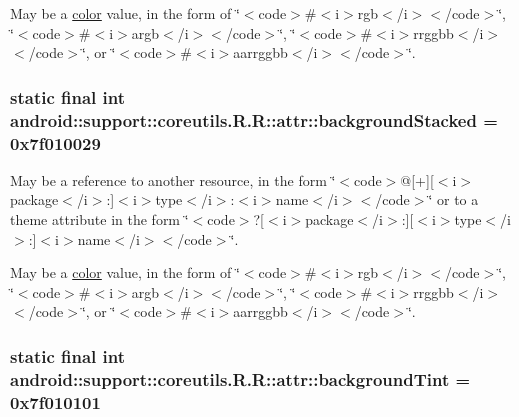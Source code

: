 May be a \hyperlink{classandroid_1_1support_1_1coreutils_1_1_r_1_1color}{color} value, in the form of \char`\"{}$<$code$>$\#$<$i$>$rgb$<$/i$>$$<$/code$>$\char`\"{}, \char`\"{}$<$code$>$\#$<$i$>$argb$<$/i$>$$<$/code$>$\char`\"{}, \char`\"{}$<$code$>$\#$<$i$>$rrggbb$<$/i$>$$<$/code$>$\char`\"{}, or \char`\"{}$<$code$>$\#$<$i$>$aarrggbb$<$/i$>$$<$/code$>$\char`\"{}. \hypertarget{classandroid_1_1support_1_1coreutils_1_1_r_1_1attr_e9e84abbf14f33931b1a8615db14a4fa}{
\subsubsection[{backgroundStacked}]{\setlength{\rightskip}{0pt plus 5cm}static final int android::support::coreutils.R.R::attr::backgroundStacked = 0x7f010029}}
\label{classandroid_1_1support_1_1coreutils_1_1_r_1_1attr_e9e84abbf14f33931b1a8615db14a4fa}


May be a reference to another resource, in the form \char`\"{}$<$code$>$@\mbox{[}+\mbox{]}\mbox{[}$<$i$>$package$<$/i$>$:\mbox{]}$<$i$>$type$<$/i$>$:$<$i$>$name$<$/i$>$$<$/code$>$\char`\"{} or to a theme attribute in the form \char`\"{}$<$code$>$?\mbox{[}$<$i$>$package$<$/i$>$:\mbox{]}\mbox{[}$<$i$>$type$<$/i$>$:\mbox{]}$<$i$>$name$<$/i$>$$<$/code$>$\char`\"{}. 

May be a \hyperlink{classandroid_1_1support_1_1coreutils_1_1_r_1_1color}{color} value, in the form of \char`\"{}$<$code$>$\#$<$i$>$rgb$<$/i$>$$<$/code$>$\char`\"{}, \char`\"{}$<$code$>$\#$<$i$>$argb$<$/i$>$$<$/code$>$\char`\"{}, \char`\"{}$<$code$>$\#$<$i$>$rrggbb$<$/i$>$$<$/code$>$\char`\"{}, or \char`\"{}$<$code$>$\#$<$i$>$aarrggbb$<$/i$>$$<$/code$>$\char`\"{}. \hypertarget{classandroid_1_1support_1_1coreutils_1_1_r_1_1attr_b2d44596291d255fb0e3d39827060a85}{
\subsubsection[{backgroundTint}]{\setlength{\rightskip}{0pt plus 5cm}static final int android::support::coreutils.R.R::attr::backgroundTint = 0x7f010101}}
\label{classandroid_1_1support_1_1coreutils_1_1_r_1_1attr_b2d44596291d255fb0e3d39827060a85}


